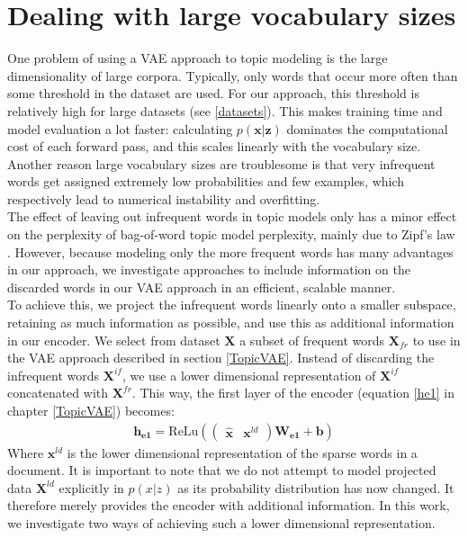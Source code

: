\documentclass{report}
\begin{document}
\section{Dealing with large vocabulary sizes}
One problem of using a VAE approach to topic modeling is the large dimensionality of large corpora. Typically, only words that occur more often than some threshold in the dataset are used. For our approach, this threshold is relatively high for large datasets (see \ref{datasets}). This makes training time and model evaluation a lot faster: calculating $p(\mathbf{x}|\mathbf{z})$ dominates the computational cost of each forward pass, and this scales linearly with the vocabulary size. Another reason large vocabulary sizes are troublesome is that very infrequent words get assigned extremely low probabilities and few examples, which respectively lead to numerical instability and overfitting. 
\\
The effect of leaving out infrequent words in topic models only has a minor effect on the perplexity of bag-of-word topic model perplexity, mainly due to Zipf's law \cite{kobayashi2014perplexity}. However, because modeling only the more frequent words has many advantages in our approach, we investigate approaches to include information on the discarded words in our VAE approach in an efficient, scalable manner.
\\
To achieve this, we project the infrequent words linearly onto a smaller subspace, retaining as much information as possible, and use this as additional information in our encoder. We select from dataset $\mathbf{X}$ a subset of frequent words $\mathbf{X}_{fr}$ to use in the VAE approach described in section \ref{TopicVAE}. Instead of discarding the infrequent words $\mathbf{X}^{if}$, we use a lower dimensional representation of $\mathbf{X}^{if}$ concatenated with $\mathbf{X}^{fr}$. This way, the first layer of the encoder (equation \ref{he1} in chapter \ref{TopicVAE}) becomes:
\begin{align}
\mathbf{h_{e1}} = \text{ReLu}(\left(\begin{matrix}
\mathbf{\hat{x}} &
\mathbf{x}^{ld}
\end{matrix}\right)\mathbf{W_{e1}} + \mathbf{b}) \label{he1_RP}
\end{align}
Where $\mathbf{x}^{ld}$ is the lower dimensional representation of the sparse words in a document.
It is important to note that we do not attempt to model projected data $\mathbf{X}^{ld}$ explicitly in $p(x|z)$  as its probability distribution has now changed.  It therefore merely provides the encoder with additional information. In this work, we investigate two ways of achieving such a lower dimensional representation. 
\end{document}
